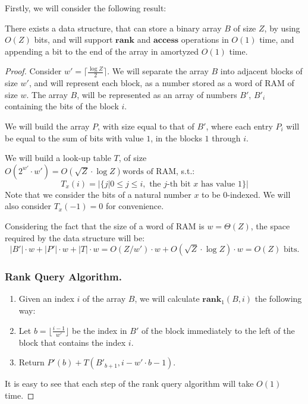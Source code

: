 \documentclass[runningheads]{llncs}
\begin{document}
Firstly, we will consider the following result:
\begin{lemma}
    There exists a data structure, that can store a binary array $B$ of size $Z$, by using $O(Z)$ bits, and will support $\textbf{rank}$ and $\textbf{access}$ operations in $O(1)$ time, 
    and appending a bit to the end of the array in amortyzed $O(1)$ time.
\end{lemma}
\begin{proof}
    Consider $w'=\lceil \frac{\log Z}{2} \rceil$. We will separate the array $B$ into adjacent blocks of size $w'$, and will represent each block, as a number stored as a word of RAM of size $w$.
    The array $B$, will be represented as an array of numbers $B'$, $B'_{i}$ containing the bits of the block $i$.
    
    We will build the array $P$, with size equal to that of $B'$, where each entry $P_i$ will be equal to the sum of bits with value $1$, in the blocks $1$ through $i$.    

    We will build a look-up table $T$, of size $O(2^{w'} \cdot w') = O(\sqrt{Z} \cdot \log Z) \text{words of RAM}$, s.t.:
        \[
            T_{x}(i) = |\{j|0\leq j\leq i, \text{ the }j\text{-th bit }x\text{ has value }1 \}|
        \]
    Note that we consider the bits of a natural number $x$ to be $0$-indexed. We will also consider $T_{x}(-1)=0$ for convenience.

    Considering the fact that the size of a word of RAM is $w=\Theta(Z)$, the space required by the data structure will be:
    \[
        |B'|\cdot w+|P'|\cdot w+|T|\cdot w = O(Z/w')\cdot w + O(\sqrt{Z}\cdot \log Z)\cdot w = O(Z) \text{ bits.}
    \]

    \subsubsection{Rank Query Algorithm. }
        \begin{enumerate}
            \item[] Given an index $i$ of the array $B$, we will calculate $\textbf{rank}_1(B, i)$ the following way:
            \item Let $b=\lfloor \frac{i-1}{w'} \rfloor $ be the index in $B'$ of the block immediately to the left of the block that contains the index $i$. 
            \item Return $P'(b)+T(B'_{b+1}, i-w' \cdot b - 1 )$.
        \end{enumerate}

        It is easy to see that each step of the rank query algorithm will take $O(1)$ time.


\end{proof}
\end{document}
